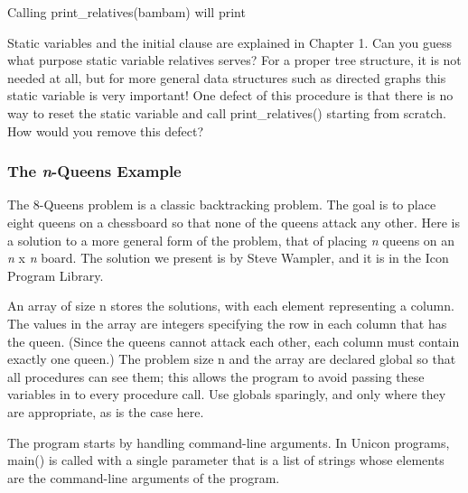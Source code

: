 Calling print\_relatives(bambam) will print


Static variables and the \textsf{initial} clause are explained in
Chapter 1. Can you guess what purpose static variable
\textsf{relatives} serves? For a proper tree structure, it is not
needed at all, but for more general data structures such as directed
graphs this static variable is very important! One defect of this
procedure is that there is no way to reset the static variable and call
\textsf{print\_relatives()} starting from scratch. How would you remove
this defect?

\subsubsection[The n{}-Queens Example]{The \textit{n}{}-Queens
Example}

The 8-Queens problem is a classic
backtracking problem. The goal is to place eight
queens on a chessboard so that none of the queens attack any other.
Here is a solution to a more general form of the problem, that of
placing \textit{n} queens on an \textit{n} \textsf{x}
\textit{n} board. The solution we present is by Steve Wampler, and it is in the Icon Program Library.

An array of size \textsf{n} stores the solutions, with each element
representing a column. The values in the array are integers specifying
the row in each column that has the queen. (Since the queens cannot
attack each other, each column must contain exactly one queen.) The
problem size \textsf{n} and the array are declared \textsf{global} so
that all procedures can see them; this allows the program to avoid
passing these variables in to every procedure call. Use globals
sparingly, and only where they are appropriate, as is the case here.


The program starts by handling command-line arguments. In Unicon
programs, \textsf{main()} is called with a single parameter that is a
list of strings whose elements are the command-line arguments of the
program.

